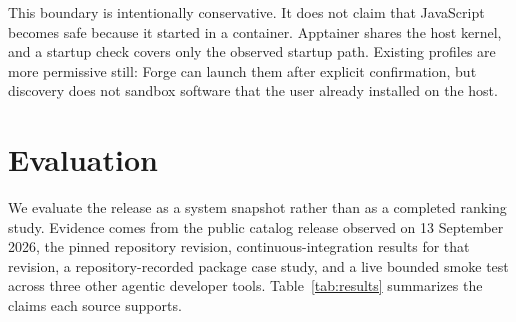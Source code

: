\documentclass[10pt,twocolumn]{article}
\begin{document}
This boundary is intentionally conservative. It does not claim that JavaScript becomes safe because it started in a container. Apptainer shares the host kernel, and a startup check covers only the observed startup path. Existing profiles are more permissive still: Forge can launch them after explicit confirmation, but discovery does not sandbox software that the user already installed on the host.\cite{profiles,sandbox}

\section{Evaluation}

We evaluate the release as a system snapshot rather than as a completed ranking study. Evidence comes from the public catalog release observed on 13 September 2026, the pinned repository revision, continuous-integration results for that revision, a repository-recorded package case study, and a live bounded smoke test across three other agentic developer tools. Table~\ref{tab:results} summarizes the claims each source supports.
\end{document}
